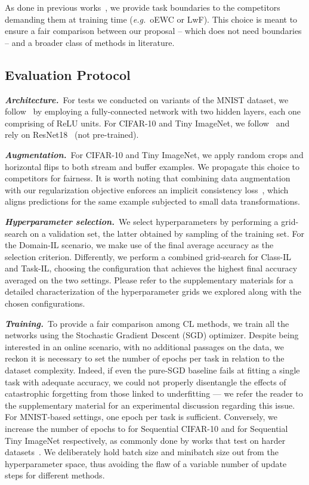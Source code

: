 \documentclass{article}
\begin{document}
As done in previous works~\cite{farquhar2018towards,rebuffi2017icarl,van2019three,wu2019large}, we provide task boundaries to the competitors demanding them at training time (\textit{e.g.}\ oEWC or LwF). This choice is meant to ensure a fair comparison between our proposal -- which does not need boundaries -- and a broader class of methods in literature.
\subsection{Evaluation Protocol}
\label{subsec:cl_eval_prot}
\textit{\textbf{Architecture.}}~For tests we conducted on variants of the MNIST dataset, we follow~\cite{lopez2017gradient, riemer2018learning} by employing a fully-connected network with two hidden layers, each one comprising of  ReLU units. For CIFAR-10 and Tiny ImageNet, we follow~\cite{rebuffi2017icarl} and rely on ResNet18~\cite{he2016deep} (not pre-trained). 

\textit{\textbf{Augmentation.}}~For CIFAR-10 and Tiny ImageNet, we apply random crops and horizontal flips to both stream and buffer examples. We propagate this choice to competitors for fairness. It is worth noting that combining data augmentation with our regularization objective enforces an implicit consistency loss~\cite{bachman2014learning, becker1992self}, which aligns predictions for the same example subjected to small data transformations.

\textit{\textbf{Hyperparameter selection.}}~We select hyperparameters by performing a grid-search on a validation set, the latter obtained by sampling  of the training set. For the Domain-IL scenario, we make use of the final average accuracy as the selection criterion. Differently, we perform a combined grid-search for Class-IL and Task-IL, choosing the configuration that achieves the highest final accuracy averaged on the two settings. Please refer to the supplementary materials for a detailed characterization of the hyperparameter grids we explored along with the chosen configurations.

\textit{\textbf{Training.}}~To provide a fair comparison among CL methods, we train all the networks using the Stochastic Gradient Descent (SGD) optimizer. Despite being interested in an online scenario, with no additional passages on the data, we reckon it is necessary to set the number of epochs per task in relation to the dataset complexity. Indeed, if even the pure-SGD baseline fails at fitting a single task with adequate accuracy, we could not properly disentangle the effects of catastrophic forgetting from those linked to underfitting --- we refer the reader to the supplementary material for an experimental discussion regarding this issue. For MNIST-based settings, one epoch per task is sufficient. Conversely, we increase the number of epochs to  for Sequential CIFAR-10 and  for Sequential Tiny ImageNet respectively, as commonly done by works that test on harder datasets~\cite{rebuffi2017icarl, wu2019large, zenke2017continual}. We deliberately hold batch size and minibatch size out from the hyperparameter space, thus avoiding the flaw of a variable number of update steps for different methods.
\end{document}
